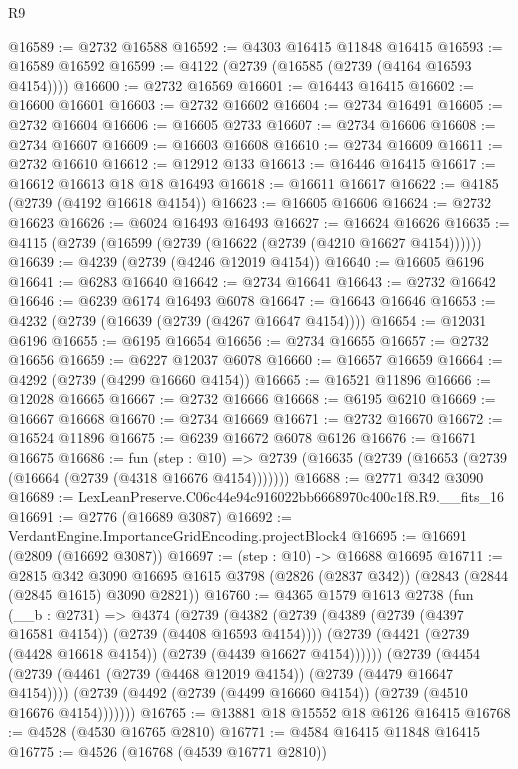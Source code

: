 \begin{lexlean}{R9}
\begin{coremodule}
@16589 := @2732 @16588
@16592 := @4303 @16415 @11848 @16415
@16593 := @16589 @16592
@16599 := @4122 (@2739 (@16585 (@2739 (@4164 @16593 @4154))))
@16600 := @2732 @16569
@16601 := @16443 @16415
@16602 := @16600 @16601
@16603 := @2732 @16602
@16604 := @2734 @16491
@16605 := @2732 @16604
@16606 := @16605 @2733
@16607 := @2734 @16606
@16608 := @2734 @16607
@16609 := @16603 @16608
@16610 := @2734 @16609
@16611 := @2732 @16610
@16612 := @12912 @133
@16613 := @16446 @16415
@16617 := @16612 @16613 @18 @18 @16493
@16618 := @16611 @16617
@16622 := @4185 (@2739 (@4192 @16618 @4154))
@16623 := @16605 @16606
@16624 := @2732 @16623
@16626 := @6024 @16493 @16493
@16627 := @16624 @16626
@16635 := @4115 (@2739 (@16599 (@2739 (@16622 (@2739 (@4210 @16627 @4154))))))
@16639 := @4239 (@2739 (@4246 @12019 @4154))
@16640 := @16605 @6196
@16641 := @6283 @16640
@16642 := @2734 @16641
@16643 := @2732 @16642
@16646 := @6239 @6174 @16493 @6078
@16647 := @16643 @16646
@16653 := @4232 (@2739 (@16639 (@2739 (@4267 @16647 @4154))))
@16654 := @12031 @6196
@16655 := @6195 @16654
@16656 := @2734 @16655
@16657 := @2732 @16656
@16659 := @6227 @12037 @6078
@16660 := @16657 @16659
@16664 := @4292 (@2739 (@4299 @16660 @4154))
@16665 := @16521 @11896
@16666 := @12028 @16665
@16667 := @2732 @16666
@16668 := @6195 @6210
@16669 := @16667 @16668
@16670 := @2734 @16669
@16671 := @2732 @16670
@16672 := @16524 @11896
@16675 := @6239 @16672 @6078 @6126
@16676 := @16671 @16675
@16686 := fun (step : @10) =>
  @2739 (@16635 (@2739 (@16653 (@2739 (@16664 (@2739 (@4318 @16676 @4154)))))))
@16688 := @2771 @342 @3090
@16689 := LexLeanPreserve.C06c44e94c916022bb6668970c400c1f8.R9.__fits_16
@16691 := @2776 (@16689 @3087)
@16692 := VerdantEngine.ImportanceGridEncoding.projectBlock4
@16695 := @16691 (@2809 (@16692 @3087))
@16697 := (step : @10) -> @16688 @16695
@16711 := @2815
    @342
    @3090
    @16695
    @1615
    @3798
    (@2826 (@2837 @342))
    (@2843 (@2844 (@2845 @1615) @3090 @2821))
@16760 := @4365
    @1579
    @1613
    @2738
    (fun (__b : @2731) =>
    @4374
      (@2739
        (@4382
          (@2739 (@4389 (@2739 (@4397 @16581 @4154)) (@2739 (@4408 @16593 @4154))))
          (@2739 (@4421 (@2739 (@4428 @16618 @4154)) (@2739 (@4439 @16627 @4154))))))
      (@2739
        (@4454
          (@2739 (@4461 (@2739 (@4468 @12019 @4154)) (@2739 (@4479 @16647 @4154))))
          (@2739 (@4492 (@2739 (@4499 @16660 @4154)) (@2739 (@4510 @16676 @4154)))))))
@16765 := @13881 @18 @15552 @18 @6126 @16415
@16768 := @4528 (@4530 @16765 @2810)
@16771 := @4584 @16415 @11848 @16415
@16775 := @4526 (@16768 (@4539 @16771 @2810))

\end{coremodule}
\end{lexlean}
